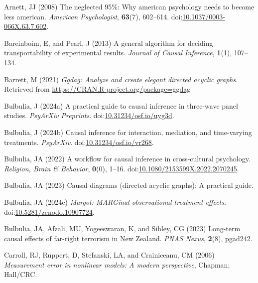 \documentclass[
  single column]{article}
\newlength{\cslhangindent}
\newenvironment{CSLReferences}[2] %
 {\begin{list}{}{%
  \setlength{\itemindent}{0pt}
  \setlength{\leftmargin}{0pt}
  \setlength{\parsep}{0pt}
  \ifodd #1
   \setlength{\leftmargin}{\cslhangindent}
   \setlength{\itemindent}{-1\cslhangindent}
  \fi
  \setlength{\itemsep}{#2\baselineskip}}}
 {\end{list}}
\begin{document}
\label{refs}
\begin{CSLReferences}{1}{0}
Arnett, JJ (2008) The neglected 95\%: Why american psychology needs to
become less american. \emph{American Psychologist}, \textbf{63}(7),
602--614.
doi:\href{https://doi.org/10.1037/0003-066X.63.7.602}{10.1037/0003-066X.63.7.602}.

Bareinboim, E, and Pearl, J (2013) A general algorithm for deciding
transportability of experimental results. \emph{Journal of Causal
Inference}, \textbf{1}(1), 107--134.

Barrett, M (2021) \emph{Ggdag: Analyze and create elegant directed
acyclic graphs}. Retrieved from
\url{https://CRAN.R-project.org/package=ggdag}

Bulbulia, J (2024a) A practical guide to causal inference in three-wave
panel studies. \emph{PsyArXiv Preprints}.
doi:\href{https://doi.org/10.31234/osf.io/uyg3d}{10.31234/osf.io/uyg3d}.

Bulbulia, J (2024b) Causal inference for interaction, mediation, and
time-varying treatments. \emph{PsyArXiv}.
doi:\href{https://doi.org/10.31234/osf.io/vr268}{10.31234/osf.io/vr268}.

Bulbulia, JA (2022) A workflow for causal inference in cross-cultural
psychology. \emph{Religion, Brain \& Behavior}, \textbf{0}(0), 1--16.
doi:\href{https://doi.org/10.1080/2153599X.2022.2070245}{10.1080/2153599X.2022.2070245}.

Bulbulia, JA (2023) Causal diagrams (directed acyclic graphs): A
practical guide.

Bulbulia, JA (2024c) \emph{Margot: MARGinal observational
treatment-effects}.
doi:\href{https://doi.org/10.5281/zenodo.10907724}{10.5281/zenodo.10907724}.

Bulbulia, JA, Afzali, MU, Yogeeswaran, K, and Sibley, CG (2023)
Long-term causal effects of far-right terrorism in {N}ew {Z}ealand.
\emph{PNAS Nexus}, \textbf{2}(8), pgad242.

Carroll, RJ, Ruppert, D, Stefanski, LA, and Crainiceanu, CM (2006)
\emph{Measurement error in nonlinear models: A modern perspective},
Chapman; Hall/CRC.


\end{CSLReferences}
\end{document}
